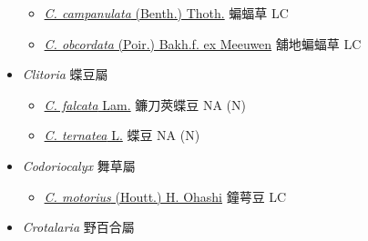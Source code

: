 \begin{itemize}
  \begin{itemize}
        \item[] \href{http://www.theplantlist.org/tpl1.1/search?q=Christia+campanulata}{\textit{C. campanulata} (Benth.) Thoth.}   蝙蝠草   LC
        \item[] \href{http://www.theplantlist.org/tpl1.1/search?q=Christia+obcordata}{\textit{C. obcordata} (Poir.) Bakh.f. ex Meeuwen}   舖地蝙蝠草   LC
  \end{itemize}
 \item[] \textit{Clitoria} 蝶豆屬
                                
  \begin{itemize}
        \item[] \href{http://www.theplantlist.org/tpl1.1/search?q=Clitoria+falcata}{\textit{C. falcata} Lam.}   鐮刀莢蝶豆   NA (N)
        \item[] \href{http://www.theplantlist.org/tpl1.1/search?q=Clitoria+ternatea}{\textit{C. ternatea} L.}   蝶豆   NA (N)
  \end{itemize}
 \item[] \textit{Codoriocalyx} 舞草屬
                                
  \begin{itemize}
        \item[] \href{http://www.theplantlist.org/tpl1.1/search?q=Codoriocalyx+motorius}{\textit{C. motorius} (Houtt.) H. Ohashi}   鐘萼豆   LC
  \end{itemize}
 \item[] \textit{Crotalaria} 野百合屬
                                

\end{itemize}
